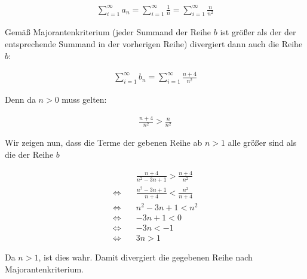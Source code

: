 \documentclass[a4paper,german,12pt,smallheadings]{scrartcl}
\begin{document}
\begin{align*}
  \sum_{i=1}^\infty a_n = \sum_{i=1}^\infty  \frac{1}{n} = \sum_{i=1}^\infty \frac{n}{n^2}
\end{align*}

Gemäß Majorantenkriterium (jeder Summand der Reihe $b$ ist größer als der der
entsprechende Summand in der vorherigen Reihe) divergiert dann auch die Reihe $b$:

\begin{align*}
  \sum_{i=1}^\infty b_n = \sum_{i=1}^\infty  \frac{n+4}{n^2}
\end{align*}

Denn da $n>0$ muss gelten:

\begin{align*}
  \frac{n+4}{n^2} > \frac{n}{n^2}
\end{align*}

Wir zeigen nun, dass die Terme der gebenen Reihe ab $n > 1$ alle größer sind
als die der Reihe $b$

\begin{align*}
 &\frac{n+4}{n^2-3n+1} > \frac{n+4}{n^2} \\
 \Leftrightarrow\quad& \frac{n^2-3n+1}{n+4} < \frac{n^2}{n+4} \\
 \Leftrightarrow\quad& n^2-3n+1 < n^2 \\
 \Leftrightarrow\quad& -3n+1 < 0 \\
 \Leftrightarrow\quad& -3n < -1 \\
 \Leftrightarrow\quad& 3n > 1
\end{align*}

Da $n > 1$, ist dies wahr. Damit divergiert die gegebenen Reihe nach Majorantenkriterium.
\end{document}
